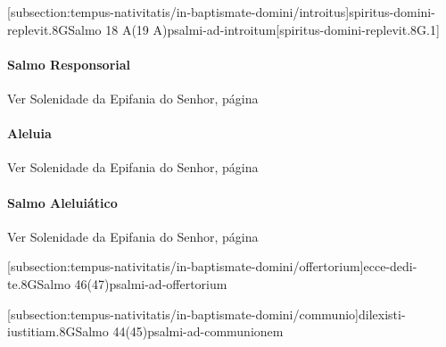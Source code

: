 \def\Prefix{subsection:tempus-nativitatis/in-baptismate-domini}

[\Prefix/introitus]{spiritus-domini-replevit.8G}{Salmo 18 A(19 A)}{psalmi-ad-introitum}[spiritus-domini-replevit.8G.1]

\paragraph{Salmo Responsorial}
\begin{rubrica}
  Ver Solenidade da Epifania do Senhor, página~\pageref{subsection:tempus-nativitatis/in-epiphania-domini/psalmus-responsorius}
\end{rubrica}

\paragraph{Aleluia}
\begin{rubrica}
  Ver Solenidade da Epifania do Senhor, página~\pageref{subsection:tempus-nativitatis/in-epiphania-domini/alleluia}
\end{rubrica}

\paragraph{Salmo Aleluiático}
\begin{rubrica}
  Ver Solenidade da Epifania do Senhor, página~\pageref{subsection:tempus-nativitatis/in-epiphania-domini/psalmus-alleluiaticus}
\end{rubrica}

\AllowPageFlush

[\Prefix/offertorium]{ecce-dedi-te.8G}{Salmo 46(47)}{psalmi-ad-offertorium}

\AllowPageBreak

[\Prefix/communio]{dilexisti-iustitiam.8G}{Salmo 44(45)}{psalmi-ad-communionem}